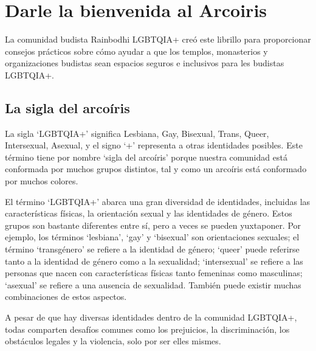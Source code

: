 \documentclass[12pt,openany]{book}
\begin{document}
\chapter*{Darle la bienvenida al Arcoiris}

\begin{figure}
\end{figure}
La comunidad budista Rainbodhi LGBTQIA+ creó este librillo para proporcionar consejos prácticos sobre cómo ayudar a que los templos, monasterios y organizaciones budistas sean espacios seguros e inclusivos para les budistas LGBTQIA+.

\section*{La sigla del arcoíris}

La sigla `LGBTQIA+' significa Lesbiana, Gay, Bisexual, Trans, Queer, Intersexual, Asexual, y el signo `+' representa a otras identidades posibles. Este término tiene por nombre `sigla del arcoíris' porque nuestra comunidad está conformada por muchos grupos distintos, tal y como un arcoíris está conformado por muchos colores.

El término `LGBTQIA+' abarca una gran diversidad de identidades, incluidas las características físicas, la orientación sexual y las identidades de género. Estos grupos son bastante diferentes entre sí, pero a veces se pueden yuxtaponer. Por ejemplo, los términos `lesbiana', `gay' y `bisexual' son orientaciones sexuales; el término `transgénero' se refiere a la identidad de género; `queer' puede referirse tanto a la identidad de género como a la sexualidad; `intersexual' se refiere a las personas que nacen con características físicas tanto femeninas como masculinas; `asexual' se refiere a una ausencia de sexualidad. También puede existir muchas combinaciones de estos aspectos.

A pesar de que hay diversas identidades dentro de la comunidad LGBTQIA+, todas comparten desafíos comunes como los prejuicios, la discriminación, los obstáculos legales y la violencia, solo por ser elles mismes.
\end{document}
